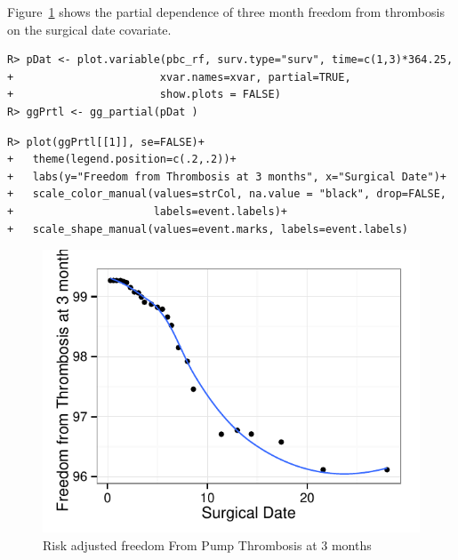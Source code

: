 \documentclass[nojss]{jss}\usepackage[]{graphicx}\usepackage[]{color}
\makeatletter
\def\maxwidth{ %
  \ifdim\Gin@nat@width>\linewidth
    \linewidth
  \else
    \Gin@nat@width
  \fi
}
\newenvironment{kframe}{%
 \def\at@end@of@kframe{}%
 \ifinner\ifhmode%
  \def\at@end@of@kframe{\end{minipage}}%
  \begin{minipage}{\columnwidth}%
 \fi\fi%
 \def\FrameCommand##1{\hskip\@totalleftmargin \hskip-\fboxsep
 \colorbox{shadecolor}{##1}\hskip-\fboxsep
     \hskip-\linewidth \hskip-\@totalleftmargin \hskip\columnwidth}%
 \MakeFramed {\advance\hsize-\width
   \@totalleftmargin\z@ \linewidth\hsize
   \@setminipage}}%
 {\par\unskip\endMakeFramed%
 \at@end@of@kframe}
\newenvironment{knitrout}{}{} %
\makeatother
\begin{document}
Figure~\ref{fig:pbc-partial-bili} shows the partial dependence of three month freedom from thrombosis on the surgical date covariate. 

\begin{knitrout}\footnotesize
{}\color{fgcolor}\begin{kframe}
\begin{verbatim}
R> pDat <- plot.variable(pbc_rf, surv.type="surv", time=c(1,3)*364.25, 
+                       xvar.names=xvar, partial=TRUE,
+                       show.plots = FALSE)
R> ggPrtl <- gg_partial(pDat )
\end{verbatim}
\end{kframe}
\end{knitrout}




\begin{knitrout}\footnotesize
{}\color{fgcolor}\begin{kframe}
\begin{verbatim}
R> plot(ggPrtl[[1]], se=FALSE)+
+   theme(legend.position=c(.2,.2))+
+   labs(y="Freedom from Thrombosis at 3 months", x="Surgical Date")+
+   scale_color_manual(values=strCol, na.value = "black", drop=FALSE,
+                      labels=event.labels)+
+   scale_shape_manual(values=event.marks, labels=event.labels)
\end{verbatim}
\end{kframe}\begin{figure}[!htpb]

{\centering \includegraphics[width=\maxwidth]{figure/rfs-pbc-partial-bili-1} 

}

\caption[Risk adjusted freedom From Pump Thrombosis at 3 months]{Risk adjusted freedom From Pump Thrombosis at 3 months\label{fig:pbc-partial-bili}}
\end{figure}


\end{knitrout}
\end{document}
